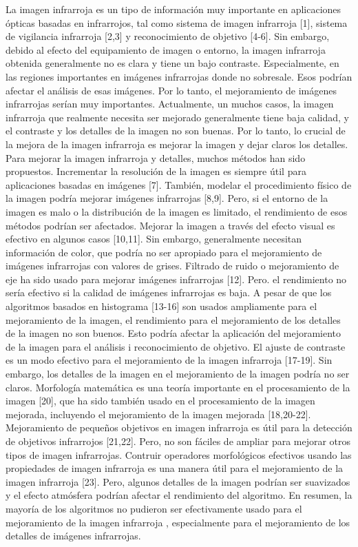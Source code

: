 \documentclass[a4paper, 11 pt, conference]{ieeeconf}      %
\begin{document}
La imagen infrarroja es un tipo de información muy importante en aplicaciones ópticas basadas en infrarrojos, tal como sistema de imagen infrarroja [1], sistema de vigilancia infrarroja [2,3] y reconocimiento de objetivo [4-6]. Sin embargo, debido al efecto del equipamiento de imagen o entorno, la imagen infrarroja obtenida generalmente no es clara y tiene un bajo contraste. Especialmente, en las regiones importantes en im\'agenes infrarrojas donde no sobresale. Esos podr\'ian afectar el an\'alisis de esas im\'agenes. Por lo tanto, el mejoramiento de im\'agenes infrarrojas ser\'ian muy importantes.
Actualmente, un muchos casos, la imagen infrarroja que realmente necesita ser mejorado generalmente tiene baja calidad, y el contraste y los detalles de la imagen no son buenas. Por lo tanto, lo crucial de la mejora de la imagen infrarroja es mejorar la imagen y dejar claros los detalles. Para mejorar la imagen infrarroja y detalles, muchos m\'etodos han sido propuestos. Incrementar la resoluci\'on de la imagen es siempre \'util para aplicaciones basadas en im\'agenes [7]. Tambi\'en, modelar el procedimiento f\'isico de la imagen podr\'ia mejorar im\'agenes infrarrojas [8,9]. Pero, si el entorno de la imagen es malo o la distribuci\'on de la imagen es limitado, el rendimiento de esos m\'etodos podr\'ian ser afectados. Mejorar la imagen a trav\'es del efecto visual es efectivo en algunos casos [10,11]. Sin embargo, generalmente necesitan informaci\'on de color, que podr\'ia no ser apropiado para el mejoramiento de im\'agenes infrarrojas con valores de grises. Filtrado de ruido o mejoramiento de eje ha sido usado para mejorar im\'agenes infrarrojas [12]. Pero. el rendimiento no ser\'ia efectivo si la calidad de im\'agenes infrarrojas es baja. A pesar de que los algoritmos basados  en histograma [13-16] son usados ampliamente para el mejoramiento de la imagen, el rendimiento para el mejoramiento de los detalles de la imagen no son buenos. Esto podr\'ia afectar la aplicaci\'on del mejoramiento de la imagen para el an\'alisis i reconocimiento de objetivo. El ajuste de contraste es un modo efectivo para el mejoramiento de la imagen infrarroja [17-19]. Sin embargo, los detalles de la imagen en el mejoramiento de la imagen podr\'ia no ser claros. Morfolog\'ia matem\'atica es una teor\'ia importante en el procesamiento de la imagen [20], que ha sido tambi\'en usado en el procesamiento de la imagen mejorada, incluyendo el mejoramiento de la imagen mejorada [18,20-22].
Mejoramiento de pequeños objetivos en imagen infrarroja es \'util para la detecci\'on de objetivos infrarrojos [21,22]. Pero, no son f\'aciles de ampliar para mejorar otros tipos de imagen infrarrojas. Contruir operadores morfol\'ogicos efectivos usando las propiedades de imagen infrarroja es una manera \'util para el mejoramiento de la imagen infrarroja [23]. Pero, algunos detalles de la imagen podr\'ian ser suavizados y el efecto atm\'osfera podr\'ian afectar el rendimiento del algoritmo. En resumen, la mayor\'ia de los algoritmos no pudieron ser efectivamente usado para el mejoramiento de la imagen infrarroja , especialmente para el mejoramiento de los detalles de im\'agenes infrarrojas.
\end{document}
